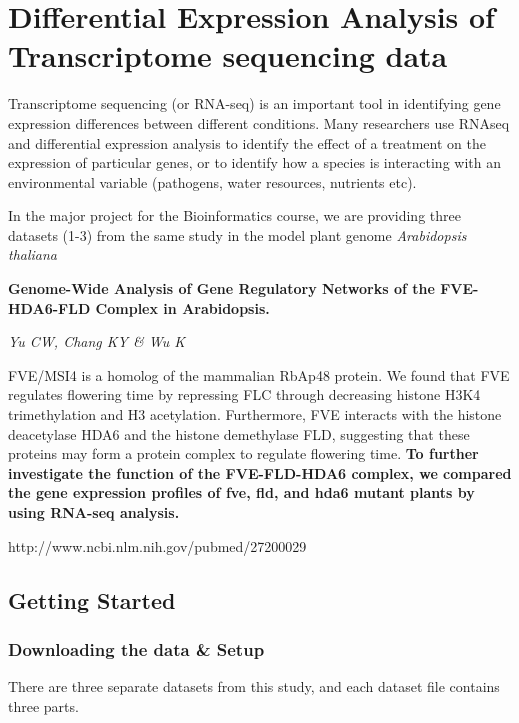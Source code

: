 \usepackage[margin=0.5in]{geometry}

\section{Differential Expression Analysis of Transcriptome sequencing
data}\label{differential-expression-analysis-of-transcriptome-sequencing-data}

Transcriptome sequencing (or RNA-seq) is an important tool in
identifying gene expression differences between different conditions.
Many researchers use RNAseq and differential expression analysis to
identify the effect of a treatment on the expression of particular
genes, or to identify how a species is interacting with an environmental
variable (pathogens, water resources, nutrients etc).

In the major project for the Bioinformatics course, we are providing
three datasets (1-3) from the same study in the model plant genome
\emph{Arabidopsis thaliana}

\textbf{Genome-Wide Analysis of Gene Regulatory Networks of the
FVE-HDA6-FLD Complex in Arabidopsis.}

\emph{Yu CW, Chang KY \& Wu K}

FVE/MSI4 is a homolog of the mammalian RbAp48 protein. We found that FVE
regulates flowering time by repressing FLC through decreasing histone
H3K4 trimethylation and H3 acetylation. Furthermore, FVE interacts with
the histone deacetylase HDA6 and the histone demethylase FLD, suggesting
that these proteins may form a protein complex to regulate flowering
time. \textbf{To further investigate the function of the FVE-FLD-HDA6
complex, we compared the gene expression profiles of fve, fld, and hda6
mutant plants by using RNA-seq analysis.}

http://www.ncbi.nlm.nih.gov/pubmed/27200029

\subsection{Getting Started}\label{getting-started}

\subsubsection{Downloading the data \&
Setup}\label{downloading-the-data-setup}

There are three separate datasets from this study, and each dataset file
contains three parts.

